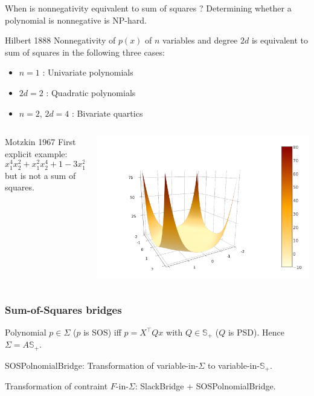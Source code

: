 \documentclass{beamer}
\begin{document}
  \begin{frame}{When is nonnegativity equivalent to sum of squares ?}
    Determining whether a polynomial is nonnegative is \alert{NP-hard}.
    \begin{block}{Hilbert 1888}
      Nonnegativity of $p(x)$ of $n$ variables and degree $2d$ is equivalent to sum of squares in the following three cases:
      \begin{itemize}
        \item $n = 1$ : Univariate polynomials
        \item $2d = 2$ : Quadratic polynomials
        \item $n = 2$, $2d = 4$ : Bivariate quartics
      \end{itemize}
    \end{block}
    \begin{columns}
      \begin{column}{0.7\textwidth}
    \begin{block}{Motzkin 1967}
      First \alert{explicit} example:
      \[ x_1^4x_2^2 + x_1^2x_2^4 + 1 - 3x_1^2x_2^2 \geq 0 \quad \forall x \]
      but is \alert{not} a sum of squares.
    \end{block}
      \end{column}
      \begin{column}{0.3\textwidth}
        \centering
        \includegraphics[trim=3cm .7cm 6cm 3cm, clip, width=\textwidth]{motzkin.png}
      \end{column}
    \end{columns}
  \end{frame}

\begin{frame}
  \frametitle{Sum-of-Squares bridges}
  Polynomial $p \in \Sigma$ ($p$ is SOS) iff
  $p = X^\top Q x$ with $Q \in \mathbb{S}_+$ ($Q$ is PSD).
  Hence $\Sigma = A \mathbb{S}_+$.

  SOSPolnomialBridge: Transformation of variable-in-$\Sigma$ to variable-in-$\mathbb{S}_+$.

  Transformation of contraint $F$-in-$\Sigma$: SlackBridge + SOSPolnomialBridge.
\end{frame}
\end{document}

